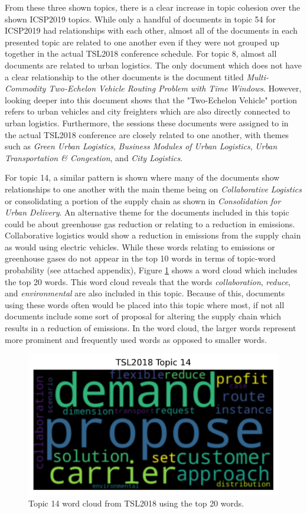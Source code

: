 \documentclass[a4paper, 12pt, twoside]{article}
\numberwithin{equation}{section} %
\begin{document}
From these three shown topics, there is a clear increase in topic cohesion over the shown ICSP2019 topics. While only a handful of documents in topic 54 for ICSP2019 had relationships with each other, almost all of the documents in each presented topic are related to one another even if they were not grouped up together in the actual TSL2018 conference schedule. For topic 8, almost all documents are related to urban logistics. The only document which does not have a clear relationship to the other documents is the document titled \textit{Multi-Commodity Two-Echelon Vehicle Routing Problem with Time Windows}. However, looking deeper into this document shows that the "Two-Echelon Vehicle" portion refers to urban vehicles and city freighters which are also directly connected to urban logistics. Furthermore, the sessions these documents were assigned to in the actual TSL2018 conference are closely related to one another, with themes such as \textit{Green Urban Logistics}, \textit{Business Modules of Urban Logistics}, \textit{Urban Transportation \& Congestion}, and \textit{City Logistics}. 

For topic 14, a similar pattern is shown where many of the documents show relationships to one another with the main theme being on \textit{Collaborative Logistics} or consolidating a portion of the supply chain as shown in \textit{Consolidation for Urban Delivery}. An alternative theme for the documents included in this topic could be about greenhouse gas reduction or relating to a reduction in emissions. Collaborative logistics would show a reduction in emissions from the supply chain as would using electric vehicles. While these words relating to emissions or greenhouse gases do not appear in the top 10 words in terms of topic-word probability (see attached appendix), Figure \ref{fig:TSL2018 14 expanded} shows a word cloud which includes the top 20 words. This word cloud reveals that the words \textit{collaboration}, \textit{reduce}, and \textit{environmental} are also included in this topic. Because of this, documents using these words often would be placed into this topic where most, if not all documents include some sort of proposal for altering the supply chain which results in a reduction of emissions. In the word cloud, the larger words represent more prominent and frequently used words as opposed to smaller words.

\begin{figure}[H]

  \centering
  \includegraphics[width=0.5\linewidth]{TSL_14_expanded.png}
\caption[TSL2018 topic 14 word cloud]{Topic 14 word cloud from TSL2018 using the top 20 words.}
\label{fig:TSL2018 14 expanded}
\end{figure}
\end{document}
